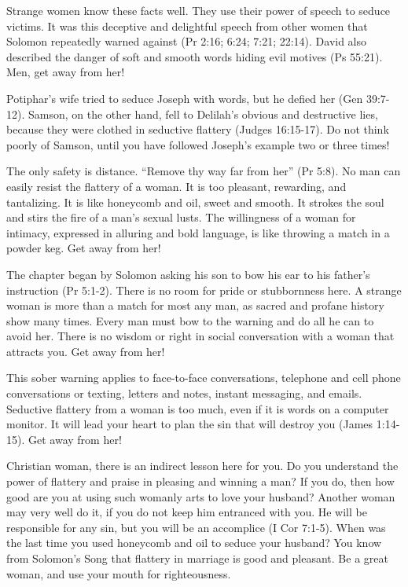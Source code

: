 Strange women know these facts well. They use their power of speech to seduce victims. It was this deceptive and delightful speech from other women that Solomon repeatedly warned against (Pr 2:16; 6:24; 7:21; 22:14). David also described the danger of soft and smooth words hiding evil motives (Ps 55:21). Men, get away from her!

Potiphar’s wife tried to seduce Joseph with words, but he defied her (Gen 39:7-12). Samson, on the other hand, fell to Delilah’s obvious and destructive lies, because they were clothed in seductive flattery (Judges 16:15-17). Do not think poorly of Samson, until you have followed Joseph’s example two or three times!

The only safety is distance. “Remove thy way far from her” (Pr 5:8). No man can easily resist the flattery of a woman. It is too pleasant, rewarding, and tantalizing. It is like honeycomb and oil, sweet and smooth. It strokes the soul and stirs the fire of a man’s sexual lusts. The willingness of a woman for intimacy, expressed in alluring and bold language, is like throwing a match in a powder keg. Get away from her!

The chapter began by Solomon asking his son to bow his ear to his father’s instruction (Pr 5:1-2). There is no room for pride or stubbornness here. A strange woman is more than a match for most any man, as sacred and profane history show many times. Every man must bow to the warning and do all he can to avoid her. There is no wisdom or right in social conversation with a woman that attracts you. Get away from her!

This sober warning applies to face-to-face conversations, telephone and cell phone conversations or texting, letters and notes, instant messaging, and emails. Seductive flattery from a woman is too much, even if it is words on a computer monitor. It will lead your heart to plan the sin that will destroy you (James 1:14-15). Get away from her!

Christian woman, there is an indirect lesson here for you. Do you understand the power of flattery and praise in pleasing and winning a man? If you do, then how good are you at using such womanly arts to love your husband? Another woman may very well do it, if you do not keep him entranced with you. He will be responsible for any sin, but you will be an accomplice (I Cor 7:1-5). When was the last time you used honeycomb and oil to seduce your husband? You know from Solomon’s Song that flattery in marriage is good and pleasant. Be a great woman, and use your mouth for righteousness.

